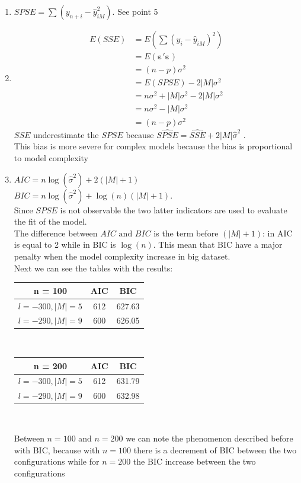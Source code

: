\documentclass[10pt,a4paper]{article}
\begin{document}
\begin{enumerate}
			\item $ SPSE = \sum (y_{n+i} - \hat{y}_{iM}^2) $. See point 5
			\item 
			\begin{align*}
			E\left( SSE \right) &= E\left( \sum \left( y_i - \hat{y}_{iM} \right)^2 \right)  \\
			&= E \left( \mathbf{\varepsilon' \varepsilon} \right) \\
			&= (n-p) \sigma^2 \\
			&= E(SPSE) - 2  |M|\sigma^2 \\
			&= n \sigma^2 + |M|\sigma^2 -2 |M|\sigma^2 \\
			&= n \sigma^2 - |M|\sigma^2 \\
			&= (n-p)\sigma^2
			\end{align*} 
			$ SSE $  underestimate the $ SPSE $ because $ \hat{SPSE} = \hat{SSE} + 2  |M| \hat{\sigma}^2$ .\\
			This bias is more severe for complex models because the bias is proportional to model complexity
			\item $ AIC =n \log(\hat{\sigma}^2) + 2 (|M| + 1) $\\
			$ BIC = n \log(\hat{\sigma}^2) + \log(n) (|M| + 1) $.\\
			Since $ SPSE  $ is not observable the two latter indicators are used to evaluate the fit of the model.\\
			The difference between $ AIC \text{ and } BIC $ is the term before $ (|M| + 1) $: in AIC is equal to 2 while in BIC is $ \log(n) $. This mean that BIC have a major penalty when the model complexity increase in big dataset.\\
			Next we can see the tables with the results:
			\begin{center}
			\begin{tabular}{|c|c|c|}
				\hline 
				n = 100 & AIC & BIC \\ 
				\hline 
				$ l = -300, |M| = 5 $ & 612 & 627.63 \\ 
				\hline 
				$ l = -290, |M| = 9 $ & 600 & 626.05 \\ 
				\hline 
			\end{tabular} \\ \medskip
			\begin{tabular}{|c|c|c|}
				\hline 
				n = 200 & AIC & BIC \\ 
				\hline 
				$ l = -300, |M| = 5 $ & 612 & 631.79 \\ 
				\hline 
				$ l = -290, |M| = 9 $ & 600 & 632.98 \\ 
				\hline 
			\end{tabular} \\
		\end{center}
			Between $ n = 100 $ and $ n = 200 $ we can note the phenomenon described before with BIC, because with $ n = 100 $ there is a decrement of BIC between the two configurations while for $ n = 200 $ the BIC increase between the two configurations


\end{enumerate}
\end{document}
